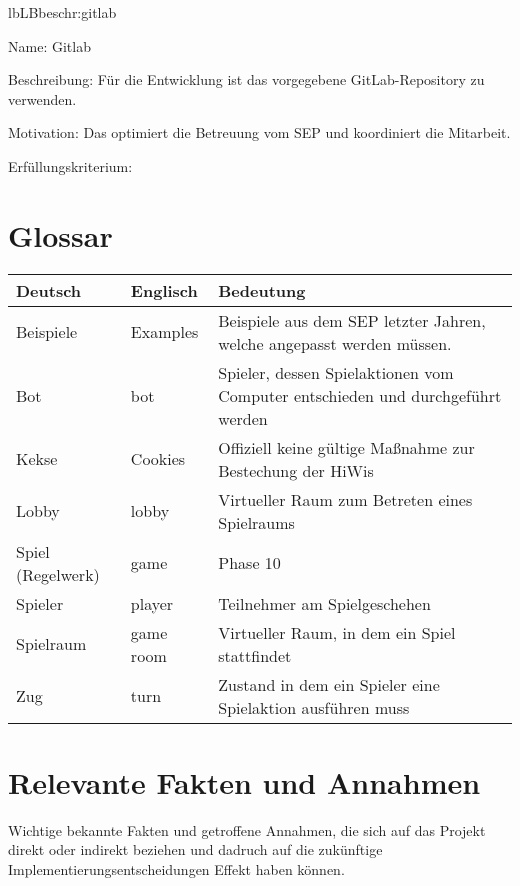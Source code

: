 \begin{description}[leftmargin=5em, style=sameline]
	\begin{lhp}{lb}{LB}{beschr:gitlab}
		\item [Name:] Gitlab
		\item [Beschreibung:] Für die Entwicklung ist das vorgegebene GitLab-Repository zu verwenden.
		\item [Motivation:] Das optimiert die Betreuung vom SEP und koordiniert die Mitarbeit.
		\item [Erfüllungskriterium:] 
	\end{lhp}
	
	
\end{description}

\section{Glossar}

\begin{center}
		\begin{longtable}{p{} p{} p{}}
			\textbf{Deutsch} & \textbf{Englisch} & \textbf{Bedeutung} \\
			\hline \hline \endhead
			Beispiele & Examples & Beispiele aus dem SEP letzter Jahren, welche angepasst werden müssen.\\                      
			Bot & bot & Spieler, dessen Spielaktionen vom Computer entschieden und durchgeführt werden\\
			Kekse & Cookies & Offiziell keine gültige Maßnahme zur Bestechung der HiWis\\          
 			Lobby & lobby & Virtueller Raum zum Betreten eines Spielraums\\	
			Spiel (Regelwerk) & game & Phase 10 \\
			Spieler & player & Teilnehmer am Spielgeschehen\\
			Spielraum & game room & Virtueller Raum, in dem ein Spiel stattfindet\\
			Zug & turn & Zustand in dem ein Spieler eine Spielaktion ausführen muss\\
		\end{longtable}
\end{center}

\section{Relevante Fakten und Annahmen}

Wichtige bekannte Fakten und getroffene Annahmen, die sich auf das Projekt direkt oder indirekt beziehen und dadruch auf die zukünftige Implementierungsentscheidungen Effekt haben können.

